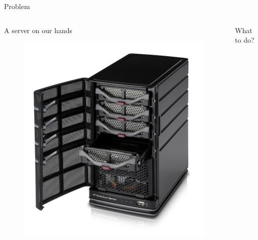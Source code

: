 \documentclass{soa.cs.pub.ro}
\begin{document}
\begin{frame}{Problem}
  \begin{columns}
    \pause
    \begin{column}[l]{0.45\textwidth}
      \begin{center}
        A server on our hands
      \end{center}
      \begin{figure}
         \includegraphics[scale=0.17]{img/hp-server.jpg}
      \end{figure}
    \end{column}
    \pause
    \begin{column}[l]{0.45\textwidth}
      \begin{center}
        What to do?
      \end{center}
      \begin{figure}

\end{figure}
\end{column}
\end{columns}
\end{frame}
\end{document}
